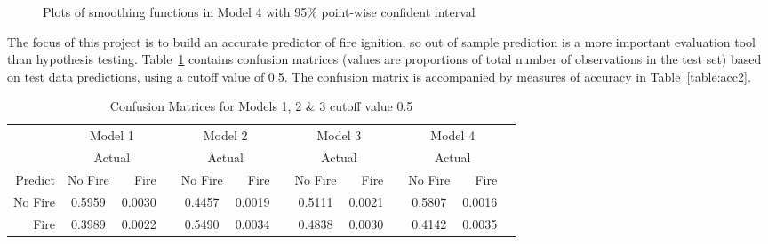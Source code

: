 \documentclass[11pt,a4paper]{article}
\begin{document}
\begin{figure}
  \null\vfill\noindent
  \hfill
  \vfill
  \hfill
  \vfill
  \hfill
  \vfill
  \null
  \caption{Plots of smoothing functions in Model 4 with 95\% point-wise confident interval}
  \label{fig:gam_pl}
\end{figure}

The focus of this project is to build an accurate predictor of fire ignition, so out of sample prediction is a more important evaluation tool than hypothesis testing. Table~\ref{table:cm2} contains confusion matrices (values are proportions of total number of observations in the test set) based on test data predictions, using a cutoff value of 0.5. The confusion matrix is accompanied by measures of accuracy in Table~\ref{table:acc2}.


\begin{table}
  \centering
  \begin{tabular}{rcrrcrrcrrcrr}
    & \multicolumn{2}{c}{Model 1} &
    & \multicolumn{2}{c}{Model 2} &
    & \multicolumn{2}{c}{Model 3} &
    & \multicolumn{2}{c}{Model 4}\\
    \cmidrule{2-3}\cmidrule{5-6}\cmidrule{8-9}\cmidrule{11-12}
    & \multicolumn{2}{c}{Actual} &
    & \multicolumn{2}{c}{Actual} &
    & \multicolumn{2}{c}{Actual} &
    & \multicolumn{2}{c}{Actual} \\
    Predict & No Fire & Fire   & & No Fire & Fire   & & No Fire & Fire   & & No Fire   & Fire\\
    \cmidrule{2-3} \cmidrule{5-6}\cmidrule{8-9}\cmidrule{11-12}
    No Fire & 0.5959  & 0.0030 & & 0.4457  & 0.0019 & & 0.5111  & 0.0021 & & 0.5807    & 0.0016 \\
    Fire    & 0.3989  & 0.0022 & & 0.5490  & 0.0034 & & 0.4838  & 0.0030 & & 0.4142    & 0.0035 \\
    \cmidrule{2-3} \cmidrule{5-6}\cmidrule{8-9}\cmidrule{11-12}
  \end{tabular}
  \caption{Confusion Matrices for Models 1, 2 \& 3 cutoff value 0.5}
  \label{table:cm2}
\end{table}
\end{document}
